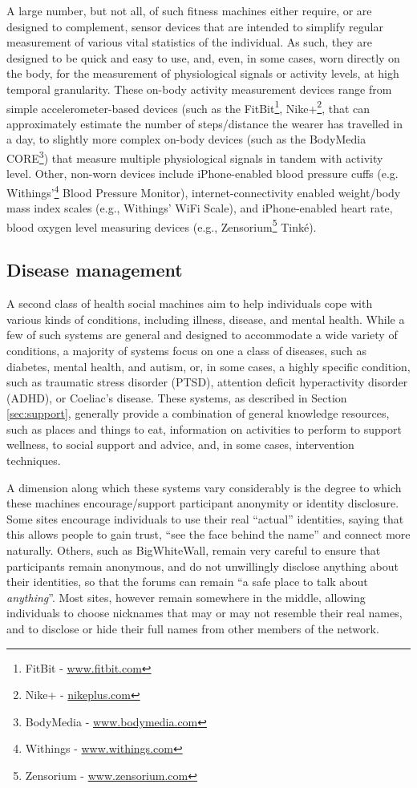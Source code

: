 \documentclass{sig-alternate}
\begin{document}
A large number, but not all, of such fitness machines either require,
or are designed to complement, sensor devices that are intended to
simplify regular measurement of various vital statistics of the
individual.  As such, they are designed to be quick and easy to use,
and, even, in some cases, worn directly on the body, for the
measurement of physiological signals or activity levels, at high
temporal granularity. These on-body activity measurement devices range
from simple accelerometer-based devices (such as the
FitBit\footnote{FitBit - \url{www.fitbit.com}}, Nike+\footnote{Nike+ -
  \url{nikeplus.com}}, that can approximately estimate the number of
steps/distance the wearer has travelled in a day, to slightly more
complex on-body devices (such as the BodyMedia CORE\footnote{BodyMedia
  - \url{www.bodymedia.com}}) that measure multiple physiological
signals in tandem with activity level.  Other, non-worn devices
include iPhone-enabled blood pressure cuffs
(e.g. Withings'\footnote{Withings - \url{www.withings.com}} Blood
Pressure Monitor), internet-connectivity enabled weight/body mass
index scales (e.g., Withings' WiFi Scale), and iPhone-enabled heart
rate, blood oxygen level measuring devices (e.g.,
Zensorium\footnote{Zensorium - \url{www.zensorium.com}} Tink\'{e}).

\subsection{Disease management}

A second class of health social machines aim to help individuals cope
with various kinds of conditions, including illness, disease, and
mental health.  While a few of such systems are general and designed
to accommodate a wide variety of conditions, a majority of systems
focus on one a class of diseases, such as diabetes, mental health, and
autism, or, in some cases, a highly specific condition, such as
traumatic stress disorder (PTSD), attention deficit hyperactivity
disorder (ADHD), or Coeliac's disease.  These systems, as described in
Section \ref{sec:support}, generally provide a combination of
general knowledge resources, such as places and things to eat,
information on activities to perform to support wellness, to social
support and advice, and, in some cases, intervention techniques.

A dimension along which these systems vary considerably is the degree
to which these machines encourage/support participant anonymity or
identity disclosure.  Some sites encourage individuals to use their
real ``actual'' identities, saying that this allows people to gain
trust, ``see the face behind the name'' and connect more naturally.
Others, such as BigWhiteWall, remain very careful to ensure that
participants remain anonymous, and do not unwillingly disclose
anything about their identities, so that the forums can remain ``a
safe place to talk about \emph{anything}''.  Most sites, however
remain somewhere in the middle, allowing individuals to choose
nicknames that may or may not resemble their real names, and to
disclose or hide their full names from other members of the network.
\end{document}
